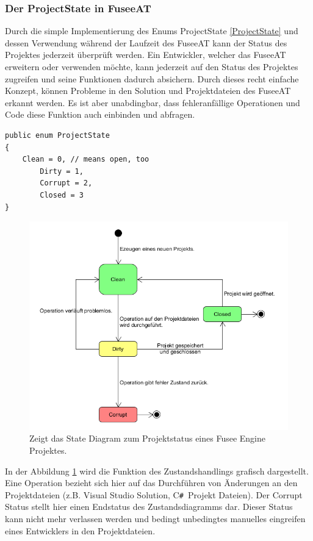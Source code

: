 \documentclass[pagesize, paper=a4, fontsize=12pt, titlepage=true, headings=small, headnosepline, abstractoff, liststotoc, nochapterprefix, plainheadsepline, twoside]{scrreprt}
\newcommand{\CSS}{C\texttt{\# }}
\begin{document}
\subsubsection{Der ProjectState in FuseeAT}
Durch die simple Implementierung des Enums ProjectState \ref{ProjectState} und dessen Verwendung während der Laufzeit des FuseeAT kann der Status des Projektes jederzeit überprüft werden. Ein Entwickler, welcher das FuseeAT erweitern oder verwenden möchte, kann jederzeit auf den Status des Projektes zugreifen und seine Funktionen dadurch absichern. Durch dieses recht einfache Konzept, können Probleme in den Solution und Projektdateien des FuseeAT erkannt werden. Es ist aber unabdingbar, dass fehleranfällige Operationen und Code diese Funktion auch einbinden und abfragen.
\begin{lstlisting}[caption=Code des ProjectState Enums. Wird in FuseeAT verwendet um die Integrität eines Projekts zu repräsentieren., label=ProjectState]
public enum ProjectState
{
	Clean = 0, // means open, too
        Dirty = 1,
        Corrupt = 2,
        Closed = 3
}
\end{lstlisting}

\begin{figure}[ht]
	\centering
	\includegraphics[width=14cm]{Bilder/ProjektStatus.png}
	\caption{Zeigt das State Diagram zum Projektstatus eines Fusee Engine Projektes.}
	\label{FuseeProjektStatus}
\end{figure}

In der Abbildung \ref{FuseeProjektStatus} wird die Funktion des Zustandshandlings grafisch dargestellt. Eine Operation bezieht sich hier auf das Durchführen von Änderungen an den Projektdateien (z.B. Visual Studio Solution, \CSS Projekt Dateien). Der Corrupt Status stellt hier einen Endstatus des Zustandsdiagramms dar. Dieser Status kann nicht mehr verlassen werden und bedingt unbedingtes manuelles eingreifen eines Entwicklers in den Projektdateien.
\end{document}
